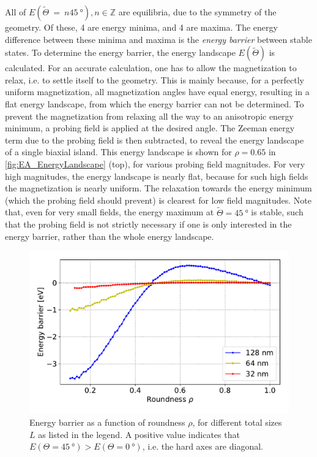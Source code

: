\documentclass[twocolumn]{phdsymp}
\begin{document}
All of $E(\widetilde{\Theta}~=~n\SI{45}{\degree}), n\in\mathbb{Z}$ are equilibria, due to the symmetry of the geometry. Of these, 4 are energy minima, and 4 are maxima. The energy difference between these minima and maxima is the \textit{energy barrier} between stable states. To determine the energy barrier, the energy landscape $E(\widetilde{\Theta})$ is calculated. For an accurate calculation, one has to allow the magnetization to relax, i.e. to settle itself to the geometry. This is mainly because, for a perfectly uniform magnetization, all magnetization angles have equal energy, resulting in a flat energy landscape, from which the energy barrier can not be determined. To prevent the magnetization from relaxing all the way to an anisotropic energy minimum, a probing field is applied at the desired angle. The Zeeman energy term due to the probing field is then subtracted, to reveal the energy landscape of a single biaxial island. This energy landscape is shown for $\rho=0.65$ in \cref{fig:EA_EnergyLandscape} (top), for various probing field magnitudes. For very high magnitudes, the energy landscape is nearly flat, because for such high fields the magnetization is nearly uniform. The relaxation towards the energy minimum (which the probing field should prevent) is clearest for low field magnitudes. Note that, even for very small fields, the energy maximum at $\widetilde{\Theta} = \SI{45}{\degree}$ is stable, such that the probing field is not strictly necessary if one is only interested in the energy barrier, rather than the whole energy landscape. \par
\begin{figure}
    \centering
    \includegraphics[width=0.9\columnwidth]{Figures/Plus_32,64,128_0.1-1_aPi128_B0.01_cell1nm.pdf}
    \caption{Energy barrier as a function of roundness $\rho$, for different total sizes $L$ as listed in the legend. A positive value indicates that $E(\Theta=\SI{45}{\degree}) > E(\Theta=\SI{0}{\degree})$, i.e. the hard axes are diagonal.}
    \label{fig:EA_EnergyRoundnessDependence}
\end{figure}
\end{document}
